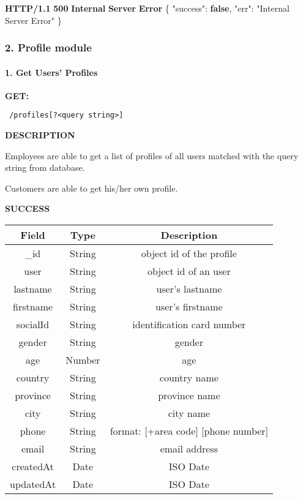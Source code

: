 \documentclass[
]{article}
\newenvironment{Shaded}{}{}
\newcommand{\DataTypeTok}[1]{\textcolor[rgb]{0.56,0.13,0.00}{#1}}
\newcommand{\ErrorTok}[1]{\textcolor[rgb]{1.00,0.00,0.00}{\textbf{#1}}}
\newcommand{\FunctionTok}[1]{\textcolor[rgb]{0.02,0.16,0.49}{#1}}
\newcommand{\KeywordTok}[1]{\textcolor[rgb]{0.00,0.44,0.13}{\textbf{#1}}}
\newcommand{\StringTok}[1]{\textcolor[rgb]{0.25,0.44,0.63}{#1}}
\begin{document}
\begin{Shaded}
\begin{Highlighting}[]
\ErrorTok{HTTP/1.1} \ErrorTok{500} \ErrorTok{Internal} \ErrorTok{Server} \ErrorTok{Error}
\FunctionTok{\{}
    \DataTypeTok{"success"}\FunctionTok{:} \KeywordTok{false}\FunctionTok{,}
    \DataTypeTok{"err"}\FunctionTok{:} \StringTok{"Internal Server Error"}
\FunctionTok{\}}
\end{Highlighting}
\end{Shaded}

\hypertarget{header-n142}{%
\subsubsection{2. Profile module}\label{header-n142}}

\hypertarget{header-n144}{%
\paragraph{1. Get Users' Profiles}\label{header-n144}}

\textbf{GET:}

\begin{verbatim}
 /profiles[?<query string>]
\end{verbatim}

\textbf{DESCRIPTION}

Employees are able to get a list of profiles of all users matched with
the query string from database.

Customers are able to get his/her own profile.

\textbf{SUCCESS}

\begin{longtable}[]{@{}ccc@{}}
\toprule
Field & Type & Description\tabularnewline
\midrule
\endhead
\_id & String & object id of the profile\tabularnewline
user & String & object id of an user\tabularnewline
lastname & String & user's lastname\tabularnewline
firstname & String & user's firstname\tabularnewline
socialId & String & identification card number\tabularnewline
gender & String & gender\tabularnewline
age & Number & age\tabularnewline
country & String & country name\tabularnewline
province & String & province name\tabularnewline
city & String & city name\tabularnewline
phone & String & format: {[}+area code{]} {[}phone
number{]}\tabularnewline
email & String & email address\tabularnewline
createdAt & Date & ISO Date\tabularnewline
updatedAt & Date & ISO Date\tabularnewline
\bottomrule
\end{longtable}
\end{document}
